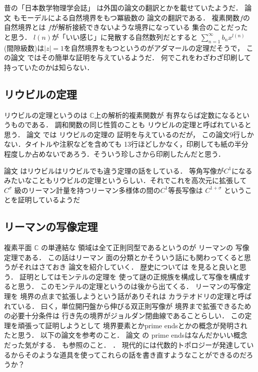 \documentclass[leqno, a4paper, 12pt]{jsarticle}
\newcommand{\cc}{\mathbb{C}}
\begin{document}
昔の「日本数学物理学会誌」
は外国の論文の翻訳とかを載せていたようだ．
論文
\cite{1927225}
もモーデルによる自然境界をもつ冪級数の
論文の翻訳である．
複素関数$f$の自然境界とは
$f$が解析接続できないような境界になっている
集合のことだったと思う．
$l(n)$が「いい感じ」に発散する自然数列だとすると
$\sum_{n=1}^{\infty}b_{n}x^{l(n)}$
(間隙級数)は$|z|=1$を自然境界をもつというのがアダマールの定理だそうで，
この論文
\cite{1927225}
ではその簡単な証明を与えているようだ．
何でこれをわざわざ印刷して持っていたのかは知らない．



\subsection{リウビルの定理}
リウビルの定理というのは
$\cc$上の解析的複素関数が
有界ならば定数になるというものである．
調和関数の同じ性質のことも
リウビルの定理と呼ばれていると思う．
論文
\cite{MR0259149}
では
リウビルの定理の
証明を与えているのだが，
この論文9行しかない．タイトルや注釈などを含めても
13行ほどしかなく，印刷しても紙の半分程度しか占めないであろう．そういう珍しさから印刷したんだと思う．

論文
\cite{MR0108809}
はリウビルはリウビルでも違う定理の話をしている．
等角写像が$C^{1}$になるみたいなこともリウビルの定理というらしい．それでこれを高次元に拡張して
$C^{\sigma}$
級のリーマン計量を持つリーマン多様体の間の$C^{1}$等長写像は
$C^{1+\sigma}$
ということを証明しているようだ





\subsection{リーマンの写像定理}
複素平面
$\cc$
の単連結な
領域は全て正則同型であるというのが
リーマンの
写像定理である．
この話はリーマン
面の分類とかそういう話にも関わってくると思うがそれはさておき
論文を紹介していく．
歴史については
\cite{MR0323996}
を見ると良いと思う．
証明としてはモンテルの定理を
使って謎の正規族を構成して写像を構成すると思う．
このモンテルの定理というのは後から出てくる．
リーマンの写像定理を
境界の点まで拡張しようという話がありそれは
カラテオドリの定理と呼ばれている．
曰く，単位開円盤から伸びる双正則写像が
境界まで拡張できるための必要十分条件は
行き先の境界がジョルダン閉曲線であることらしい．
この定理を頑張って証明しようとして
境界要素とかprime endsとかの概念が発明されたと思う．
以下の論文を参考のこと．
\cite{qiu2013riemann}
\cite{MR0100090}
論文
\cite{MR0614728}
の
prime endsはなんだかいい概念だった気がする．
\cite{MR0145063}も参照のこと．
\cite{MR0272994}．
現代的には代数的トポロジーが発達しているからそのような道具を使ってこれらの話を書き直すようなことができるのだろうか？
\end{document}
